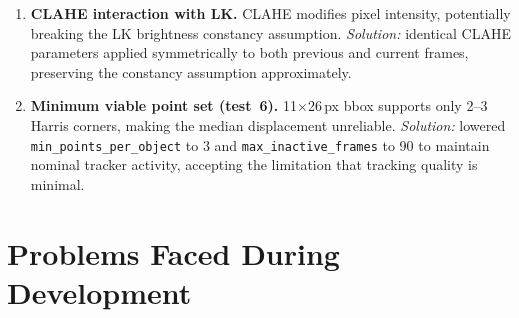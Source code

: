 \documentclass[12pt,a4paper]{article}
\begin{document}
\begin{enumerate}[leftmargin=1.8em]
  \item \textbf{CLAHE interaction with LK.} CLAHE modifies pixel intensity, potentially breaking
    the LK brightness constancy assumption. \textit{Solution:} identical CLAHE parameters applied
    symmetrically to both previous and current frames, preserving the constancy assumption approximately.

  \item \textbf{Minimum viable point set (test~6).} 11$\times$26\,px bbox supports only 2--3
    Harris corners, making the median displacement unreliable. \textit{Solution:} lowered
    \texttt{min\_points\_per\_object} to 3 and \texttt{max\_inactive\_frames} to 90 to maintain
    nominal tracker activity, accepting the limitation that tracking quality is minimal.
\end{enumerate}

\section{Problems Faced During Development}
\end{document}
